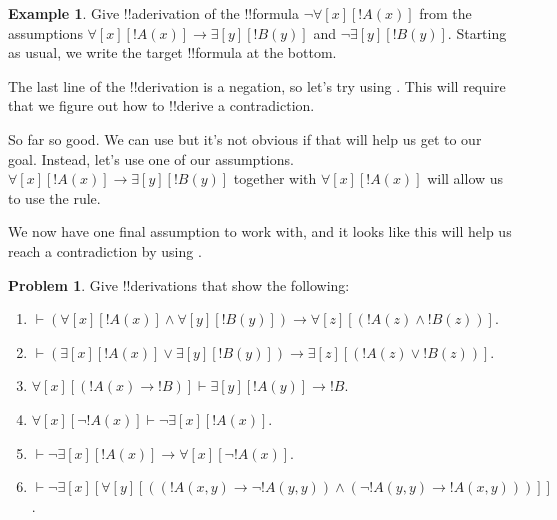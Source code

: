 \documentclass[10pt,a4paper]{article}
\theoremstyle{plain}
\theoremstyle{definition}
\newtheorem{ex}[thm]{Example}
\newtheorem{prob}{Problem}[section]
\theoremstyle{remark}
\providecommand{\AxiomC}[1]{}
\providecommand{\UnaryInfC}[1]{}
\providecommand{\BinaryInfC}[1]{}
\providecommand{\RightLabel}[1]{}
\newenvironment{prooftree}{}{}
\providecommand{\lif}{\mathbin{\rightarrow}}
\providecommand{\lforall}{\mathord{\forall}}
\providecommand{\lexists}{\mathord{\exists}}
\providecommand{\lfalse}{\bot}
\providecommand{\Proves}{\mathrel{\vdash}}
\providecommand{\Elim}[1]{}
\providecommand{\Intro}[1]{}
\providecommand{\Discharge}{\mathrm{Dis}}
\providecommand{\Intro}{\mathrm{I}}
\providecommand{\DischargeRule}{\mathrm{Dis}}
\providecommand{\DischargeRule}{\mathrm{Dis}}
\begin{document}
\begin{ex}
Give !!a{derivation} of the !!{formula}
$\lnot\lforall[x][!A(x)]$ from the assumptions $\lforall[x][!A(x)] 
\lif \lexists[y][!B(y)]$ and $\lnot\lexists[y][!B(y)]$.
Starting as usual, we write the target !!{formula} at the bottom.
\begin{prooftree}
\AxiomC{}
\UnaryInfC{$\lnot\lforall[x][!A(x)]$}
\end{prooftree}
The last line of the !!{derivation} is a negation, so let's try using
\Intro{\lnot}. This will require that we figure out how to !!{derive}
a contradiction.
\begin{prooftree}
\AxiomC{$\Discharge{\lforall[x][!A(x)]}{1}$}
\DeduceC{$\lfalse$}
\DischargeRule{\Intro{\lnot}}{1}
\UnaryInfC{$\lnot\lforall[x][!A(x)]$}
\end{prooftree}
So far so good. We can use \Elim{\lforall} but it's not obvious
if that will help us get to our goal. Instead, let's use one of our 
assumptions. $\lforall[x][!A(x)] \lif \lexists[y][!B(y)]$ together
with $\lforall[x][!A(x)]$ will allow us to use the \Elim{\lif} rule.
\begin{prooftree}
\AxiomC{$\lforall[x][!A(x)] \lif \lexists[y][!B(y)]$}
\AxiomC{$\Discharge{\lforall[x][!A(x)]}{1}$}
\RightLabel{\Elim{\lif}}
\BinaryInfC{$\lexists[y][!B(y)]$}
\DeduceC{$\lfalse$}
\DischargeRule{\Intro{\lnot}}{1}
\UnaryInfC{$\lnot\lforall[x][!A(x)]$}
\end{prooftree}
We now have one final assumption to work with,
and it looks like this will help us reach a contradiction
by using \Elim{\lnot}.
\begin{prooftree}
\AxiomC{$\lnot\lexists[y][!B(y)]$}
\AxiomC{$\lforall[x][!A(x)] \lif \lexists[y][!B(y)]$}
\AxiomC{$\Discharge{\lforall[x][!A(x)]}{1}$}
\RightLabel{\Elim{\lif}}
\BinaryInfC{$\lexists[y][!B(y)]$}
\RightLabel{\Elim{\lnot}}
\BinaryInfC{$\lfalse$}
\DischargeRule{\Intro{\lnot}}{1}
\UnaryInfC{$\lnot\lforall[x][!A(x)]$}
\end{prooftree}
\end{ex}

\begin{prob}
Give !!{derivation}s that show the following:
\begin{enumerate}
\item $\Proves (\lforall[x][!A(x)] \land \lforall[y][!B(y)]) \lif
\lforall[z][(!A(z) \land !B(z))]$.
\item $\Proves (\lexists[x][!A(x)] \lor \lexists[y][!B(y)]) \lif
\lexists[z][(!A(z) \lor !B(z))]$.
\item $\lforall[x][(!A(x) \lif !B)] \Proves \lexists[y][!A(y)] \lif !B$.
\item $\lforall[x][\lnot !A(x)] \Proves \lnot\lexists[x][!A(x)]$.
\item $\Proves \lnot\lexists[x][!A(x)] \lif \lforall[x][\lnot !A(x)]$.
\item $\Proves \lnot\lexists[x][\lforall[y][((!A(x,y) \lif \lnot
!A(y,y)) \land (\lnot !A(y,y) \lif !A(x,y)))]]$.
\end{enumerate}
\end{prob}
\end{document}
